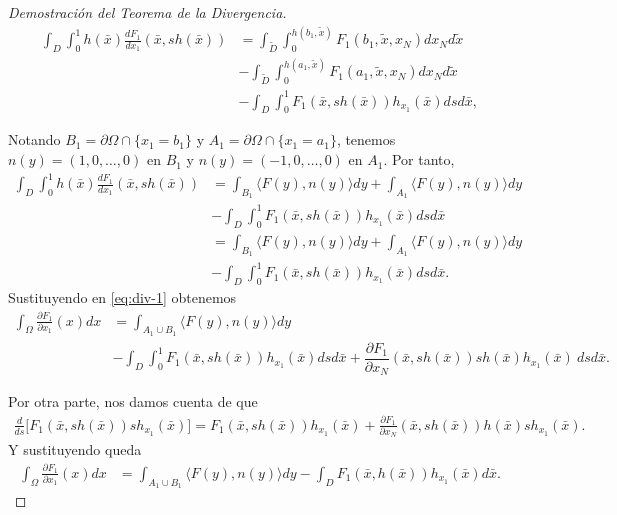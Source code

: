 \documentclass[12pt,spanish]{article}
\theoremstyle{definition}
\theoremstyle{remark}
\begin{document}
\begin{proof}[Demostración del Teorema de la Divergencia]
	\begin{align*}
	\int_D\int_0^1 h(\bar{x})\frac{d F_1}{d x_1}(\bar{x},sh(\bar{x}))&=\int_{\tilde{D}}\int_0^{h(b_1,\tilde{x})} F_1(b_1,\tilde{x}, x_N) dx_N d\tilde{x}\\&-\int_{\tilde{D}}\int_0^{h(a_1,\tilde{x})} F_1(a_1,\tilde{x}, x_N) dx_N d\tilde{x}\\&-\int_D\int_0^1 F_1(\bar{x},sh(\bar{x}))h_{x_1}(\bar{x})dsd\bar{x},
	\end{align*}
	
	Notando $B_1=\partial\Omega\cap\{x_1=b_1\}$ y $A_1=\partial\Omega\cap\{x_1=a_1\}$, tenemos $n(y)=(1,0,\ldots,0)$ en $B_1$ y $n(y)=(-1,0,\ldots,0)$ en $A_1$. Por tanto,
	\begin{align*}
	\int_D\int_0^1 h(\bar{x})\frac{d F_1}{d x_1}(\bar{x},sh(\bar{x}))&=\int_{B_1}\langle F(y),n(y)\rangle dy+\int_{A_1}\langle F(y),n(y)\rangle dy\\&-\int_D\int_0^1 F_1(\bar{x},sh(\bar{x}))h_{x_1}(\bar{x})dsd\bar{x} \\
	&=\int_{B_1}\langle F(y),n(y)\rangle dy+\int_{A_1}\langle F(y),n(y)\rangle dy\\&-\int_D\int_0^1 F_1(\bar{x},sh(\bar{x}))h_{x_1}(\bar{x})dsd\bar{x}.
	\end{align*}
	Sustituyendo en \eqref{eq:div-1} obtenemos
	\begin{align*}
	\int_\Omega\frac{\partial F_1}{\partial x_1}(x)dx
	&=\int_{A_1\cup B_1}\langle F(y),n(y)\rangle dy\\&-\int_D\int_0^1 F_1(\bar{x},sh(\bar{x}))h_{x_1}(\bar{x})dsd\bar{x}+\dfrac{\partial F_1}{\partial x_N}(\bar{x},sh(\bar{x}))sh(\bar{x})h_{x_1}(\bar{x}) \ dsd\bar{x}.
	\end{align*}
	
	Por otra parte, nos damos cuenta de que
	\begin{align*}
	\frac{d}{ds}\big[F_1(\bar{x},sh(\bar{x}))sh_{x_1}(\bar{x})\big]=F_1(\bar{x},sh(\bar{x}))h_{x_1}(\bar{x})+\frac{\partial F_1}{\partial x_N}(\bar{x},sh(\bar{x}))h(\bar{x})sh_{x_1}(\bar{x}).
	\end{align*}
	Y sustituyendo queda
	\begin{align*}
	\int_\Omega\frac{\partial F_1}{\partial x_1}(x)dx
	&=\int_{A_1\cup B_1}\langle F(y),n(y)\rangle dy-\int_D F_1(\bar{x},h(\bar{x}))h_{x_1}(\bar{x})d\bar{x}.
	\end{align*}
	

\end{proof}
\end{document}

